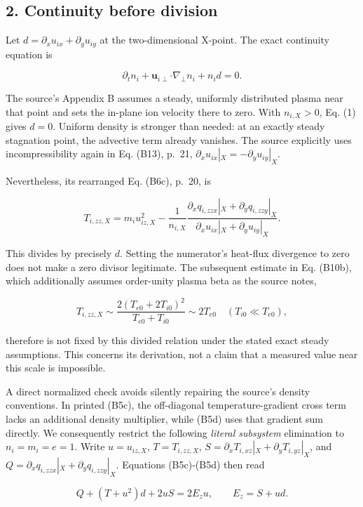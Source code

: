 \subsection{2. Continuity before
division}\label{continuity-before-division}

Let \(d=\partial_xu_{ix}+\partial_yu_{iy}\) at the two-dimensional
X-point. The exact continuity equation is

\[
\partial_t n_i+\boldsymbol{u}_{i\perp}\boldsymbol{\cdot}\nabla_\perp n_i+n_i d=0.\tag{1}
\]

The source's Appendix B assumes a steady, uniformly distributed plasma
near that point and sets the in-plane ion velocity there to zero. With
\(n_{i,X}>0\), Eq. (1) gives \(d=0\). Uniform density is stronger than
needed: at an exactly steady stagnation point, the advective term
already vanishes. The source explicitly uses incompressibility again in
Eq. (B13), p.~21, \(\partial_xu_{ix}|_X=-\partial_yu_{iy}|_X\).

Nevertheless, its rearranged Eq. (B6c), p.~20, is

\[
T_{i,zz,X}=m_i u_{iz,X}^{2}
-\frac{1}{n_{i,X}}
\frac{\partial_xq_{i,zzx}|_X+\partial_yq_{i,zzy}|_X}
{\partial_xu_{ix}|_X+\partial_yu_{iy}|_X}.\tag{2}
\]

This divides by precisely \(d\). Setting the numerator's heat-flux
divergence to zero does not make a zero divisor legitimate. The
subsequent estimate in Eq. (B10b), which additionally assumes
order-unity plasma beta as the source notes,

\[
T_{i,zz,X}\sim
\frac{2(T_{e0}+2T_{i0})^2}{T_{e0}+T_{i0}}
\sim2T_{e0}\quad(T_{i0}\ll T_{e0}),\tag{3}
\]

therefore is not fixed by this divided relation under the stated exact
steady assumptions. This concerns its derivation, not a claim that a
measured value near this scale is impossible.

A direct normalized check avoids silently repairing the source's density
conventions. In printed (B5c), the off-diagonal temperature-gradient
cross term lacks an additional density multiplier, while (B5d) uses that
gradient sum directly. We consequently restrict the following
\emph{literal subsystem} elimination to \(n_i=m_i=e=1\). Write
\(u=u_{iz,X}\), \(T=T_{i,zz,X}\),
\(S=\partial_xT_{i,xz}|_X+\partial_yT_{i,yz}|_X\), and
\(Q=\partial_xq_{i,zzx}|_X+\partial_yq_{i,zzy}|_X\). Equations
(B5c)-(B5d) then read

\[
Q+(T+u^2)d+2uS=2E_z u,\qquad E_z=S+ud.\tag{4}
\]

